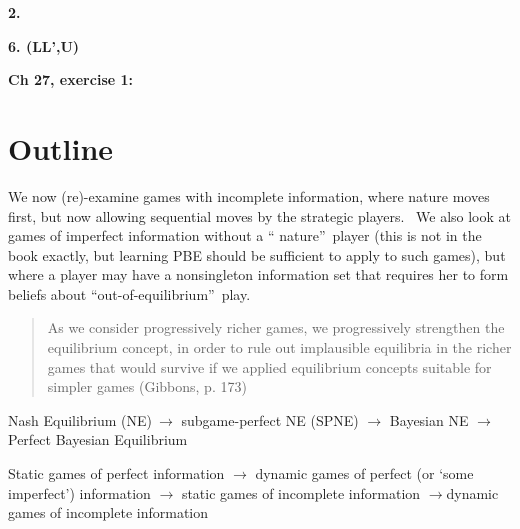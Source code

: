 \documentclass{article}
\begin{document}
\bigskip

\bigskip

\textbf{2.}


\bigskip

\textbf{6. (LL',U)}

\bigskip

\textbf{Ch 27, exercise 1:}


\section{Outline}

We now (re)-examine games with incomplete information, where nature moves
first, but now allowing sequential moves by the strategic players. \ We also
look at games of imperfect information without a \textquotedblleft
nature\textquotedblright\ player {\footnotesize (this is not in the book
exactly, but learning PBE should be sufficient to apply to such games)}, but
where a player may have a nonsingleton information set that requires her to
form beliefs about \textquotedblleft out-of-equilibrium\textquotedblright\
play. \bigskip

\begin{quote}
As we consider progressively richer games, we progressively strengthen the
equilibrium concept, in order to rule out implausible equilibria in the
richer games that would survive if we applied equilibrium concepts suitable
for simpler games (Gibbons, p. 173)
\end{quote}

Nash Equilibrium (NE)$\ \mathbf{\rightarrow }$ subgame-perfect NE (SPNE) $%
\mathbf{\rightarrow }$ Bayesian NE $\mathbf{\rightarrow }$ Perfect Bayesian
Equilibrium

Static games of perfect information $\mathbf{\rightarrow }$ dynamic games of
perfect (or `some imperfect') information $\mathbf{\rightarrow }$ static
games of incomplete information $\mathbf{\rightarrow }$dynamic games of
incomplete information
\end{document}

